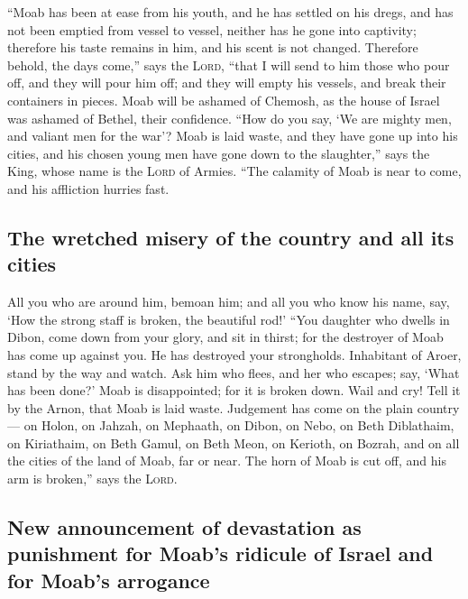  ``Moab has been at ease from his youth, and he has
settled on his dregs, and has not been emptied from vessel to vessel,
neither has he gone into captivity; therefore his taste remains in him,
and his scent is not changed.  Therefore behold, the days
come,'' says the \textsc{Lord}, ``that I will send to him those who pour
off, and they will pour him off; and they will empty his vessels, and
break their containers in pieces.  Moab will be ashamed
of Chemosh, as the house of Israel was ashamed of Bethel, their
confidence.  ``How do you say, `We are mighty men, and
valiant men for the war'?  Moab is laid waste, and they
have gone up into his cities, and his chosen young men have gone down to
the slaughter,'' says the King, whose name is the \textsc{Lord} of
Armies.  ``The calamity of Moab is near to come, and his
affliction hurries fast.

\hypertarget{the-wretched-misery-of-the-country-and-all-its-cities}{%
\subsection{The wretched misery of the country and all its
cities}\label{the-wretched-misery-of-the-country-and-all-its-cities}}

 All you who are around him, bemoan him; and all you who
know his name, say, `How the strong staff is broken, the beautiful rod!'
 ``You daughter who dwells in Dibon, come down from your
glory, and sit in thirst; for the destroyer of Moab has come up against
you. He has destroyed your strongholds.  Inhabitant of
Aroer, stand by the way and watch. Ask him who flees, and her who
escapes; say, `What has been done?'  Moab is
disappointed; for it is broken down. Wail and cry! Tell it by the Arnon,
that Moab is laid waste.  Judgement has come on the plain
country--- on Holon, on Jahzah, on Mephaath,  on Dibon,
on Nebo, on Beth Diblathaim,  on Kiriathaim, on Beth
Gamul, on Beth Meon,  on Kerioth, on Bozrah, and on all
the cities of the land of Moab, far or near.  The horn of
Moab is cut off, and his arm is broken,'' says the \textsc{Lord}.

\hypertarget{new-announcement-of-devastation-as-punishment-for-moabs-ridicule-of-israel-and-for-moabs-arrogance}{%
\subsection{New announcement of devastation as punishment for Moab's
ridicule of Israel and for Moab's
arrogance}\label{new-announcement-of-devastation-as-punishment-for-moabs-ridicule-of-israel-and-for-moabs-arrogance}}

